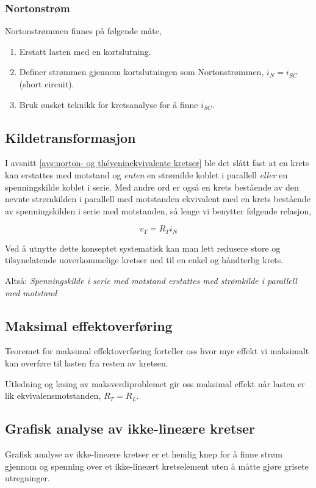 \documentclass[norsk, a4paper, 12pt, twoside, titlepage]{article}
\begin{document}
\subsubsection{Nortonstrøm}
Nortonstrømmen finnes på følgende måte,
\begin{enumerate}
\item Erstatt lasten med en kortslutning.
\item Definer strømmen gjennom kortslutningen som Nortonstrømmen,
  $i_{N} = i_{SC}$ (short circuit).
\item Bruk ønsket teknikk for kretsanalyse for å finne $i_{SC}$.
\end{enumerate}

\subsection{Kildetransformasjon}
I avsnitt \ref{avs:norton- og théveninekvivalente kretser} ble det
slått fast at en krets kan erstattes med motstand og \emph{enten} en
strømilde koblet i parallell \emph{eller} en spenningskilde koblet i
serie. Med andre ord er også en krets bestående av den nevnte strømkilden i
parallell med motstanden ekvivalent med en krets bestående av
spenningskilden i serie med motstanden, så lenge vi benytter følgende
relasjon,

\begin{equation}
v_{T} = R_{T}i_{N}
\end{equation}

Ved å utnytte dette konseptet systematisk kan man lett redusere store
og tilsynelatende uoverkommelige kretser ned til en enkel og
håndterlig krets.

Altså: \emph{Spenningskilde i serie med motstand erstattes med
  strømkilde i parallell med motstand}

\subsection{Maksimal effektoverføring}
Teoremet for maksimal effektoverføring forteller oss hvor mye effekt
vi maksimalt kan overføre til lasten fra resten av kretsen.

Utledning og løsing av maksverdiproblemet gir oss maksimal effekt når
lasten er lik ekvivalensmotstanden, $R_{T} = R_{L}$.


\subsection{Grafisk analyse av ikke-lineære kretser}
Grafisk analyse av ikke-lineære kretser er et hendig knep for å finne
strøm gjennom og spenning over et ikke-lineært kretselement uten å
måtte gjøre grisete utregninger.
\end{document}
